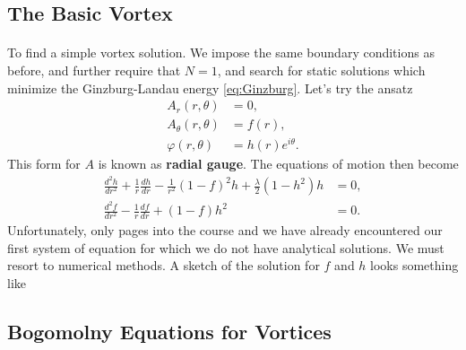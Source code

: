 \documentclass[11pt, fleqn]{article}
\begin{document}
\subsection{The Basic Vortex}

\paragraph{} To find a simple vortex solution. We impose the same boundary conditions as before, and further require that $ N = 1 $, and search for static solutions which minimize the Ginzburg-Landau energy \eqref{eq:Ginzburg}. Let's try the ansatz
	\begin{subequations}\begin{align}
		A_r(r, \theta) &= 0, \\
		A_\theta(r, \theta) &= f(r), \\
		\varphi (r,\theta) &= h(r) e^{i\theta}.
	\end{align}\end{subequations}
This form for $ A $ is known as \textbf{radial gauge}. The equations of motion then become
	\begin{align}
		\frac{d^2 h}{dr^2} + \frac{1}{r} \frac{dh}{dr} - \frac{1}{r^2} (1-f)^2 h + \frac{\lambda}{2} (1 - h^2) h &= 0,\\
		\frac{d^2 f}{dr^2} - \frac{1}{r} \frac{d f}{dr} + (1-f) h^2 &= 0.
	\end{align}
Unfortunately, only  pages into the course and we have already encountered our first system of equation for which we do not have analytical solutions. We must resort to numerical methods. A sketch of the solution for $ f $ and $ h $ looks something like
	\begin{center}
		
	\end{center}

\subsection{Bogomolny Equations for Vortices}\label{sec:BogoVort}
\end{document}
